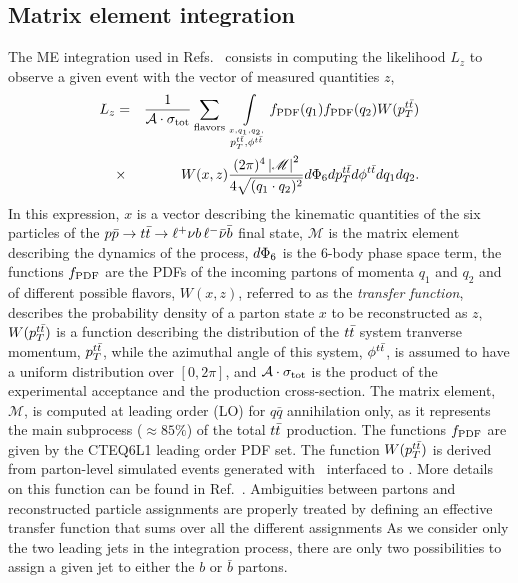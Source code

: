 \documentclass[aps,prd,twocolumn,showpacs,superscriptaddress,groupedaddress,floatfix]{revtex4}
\begin{document}
\subsection{Matrix element integration}
The  ME integration  used in Refs.~\cite{Abazov:2011fc,Abazov:2015spa} consists in computing
the likelihood $L_z$ to observe a given event with the vector of measured quantities $z$, 
\begin{eqnarray}
L_z &= &\frac 1 { {\cal A}\cdot\sigma_{\mathrm{tot}}}  \sum_{\text{flavors}}\
\int\limits_{ \stackrel{x,q_{1},q_{2},}{  p^{t\bar{t}}_T ,\phi^{t\bar{t}}}}  
 f_ {{\rm PDF}}(q_{1})f_{{\rm PDF}}(q_{2})W(p^{t\bar{t}}_T) 
\nonumber\\ &\times&
 W(x,z)
\frac{(2 \pi)^{4} \left|\mathscr{M}\right|^{2}}
       {4 \sqrt{(q_{1} \cdot q_{2})^{2}}}
        {{d} }\Phi_{6}
{d} p^{t\bar{t}}_T{d}\phi^{t\bar{t}} {d} q_{1} {d} q_{2}.
\label{eq:diff-probability}
\end{eqnarray}
In this expression, $x$ is  a vector describing the kinematic quantities
of the six  particles of the $p\bar p \to t\bar{t} \to \ell^+\nu b\,\ell^-\bar{\nu} \bar{b}$ final state,
 $\mathscr{M}$ is the matrix element describing the dynamics of the process,
 ${{d} }\Phi_{6}$ is the 6-body phase space term,
the functions $f_{{\rm PDF}}$ are the PDFs of the incoming partons of  momenta $q_1$ and $q_2 $ and of different possible flavors,
$W(x,z)$, referred to as the {\it transfer function},
describes the probability density of a parton state $x$ to be reconstructed as $z$, 
$W(p^{t\bar{t}}_T)$ is a function describing the distribution of the $t\bar{t}$ system tranverse momentum, 
$p^{t\bar{t}}_T$, while the azimuthal angle of this system, $\phi^{t\bar{t}}$,
is assumed to have a uniform distribution over $[0,2\pi]$,
and  ${ {\cal A}\cdot\sigma_{\mathrm{tot}}}$ is the product of the experimental acceptance and the
production cross-section.
The matrix element,
$\mathscr{M}$, is computed  at leading order (LO) for $q\bar q$ annihilation only,
as it represents the main subprocess ($\approx 85\%$)  of the total $t\bar{t}$ production.
The functions   $f_{{\rm PDF}}$ are given by the {\textsc{CTEQ6L1}} leading order PDF set.
The function $W(p^{t\bar{t}}_T)$ is derived from parton-level simulated events generated with \alpgen\ interfaced to \pythia. More details on this function can be found in Ref.~\cite{Grohsjean:2008zz}.
Ambiguities between  partons and reconstructed particle assignments are properly treated by defining an effective transfer function that sums over all the different assignments
As we consider only the two leading jets in the integration process,
there  are only two possibilities to assign a  given jet to either the $b$ or $\bar b$ partons. 
\end{document}

